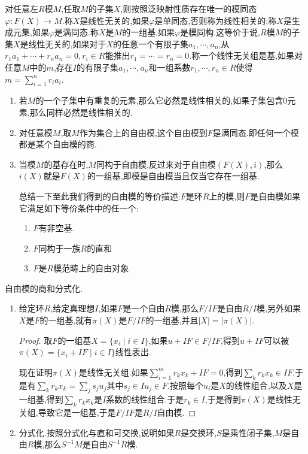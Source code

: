 对任意左$R$模$M$,任取$M$的子集$X$,则按照泛映射性质存在唯一的模同态$\varphi:F(X)\to M$.称$X$是线性无关的,如果$\varphi$是单同态,否则称为线性相关的;称$X$是生成元集,如果$\varphi$是满同态.称$X$是$M$的一组基,如果$\varphi$是模同构.这等价于说,$R$模$M$的子集$X$是线性无关的,如果对于$X$的任意一个有限子集$a_1,\cdots,a_n$,从
$r_1a_1+\cdots+r_na_n=0,r_i\in R$能推出$r_1=\cdots=r_n=0$.称一个线性无关组是基,如果对任意$M$中的$m$,存在$I$的有限子集$a_1,\cdots,a_n$和一组系数$r_1,\cdots,r_n\in R$使得$m=\sum_{i=1}^nr_ia_i$.
\begin{enumerate}
	\item 若$M$的一个子集中有重复的元素,那么它必然是线性相关的,如果子集包含0元素,那么同样必然是线性相关的.
	\item 对任意模$M$,取$M$作为集合上的自由模,这个自由模到$F$是满同态.即任何一个模都是某个自由模的商.
	\item 当模$M$的基存在时,$M$同构于自由模,反过来对于自由模$(F(X),i)$,那么$i(X)$就是$F(X)$的一组基,即模是自由模当且仅当它存在一组基.
	
	总结一下至此我们得到的自由模的等价描述:$F$是环$R$上的模,则$F$是自由模如果它满足如下等价条件中的任一个:
	\begin{enumerate}
		\item $F$有非空基.
		\item $F$同构于一族$R$的直和
		\item $F$是$R$模范畴上的自由对象
	\end{enumerate}
\end{enumerate}

自由模的商和分式化.
\begin{enumerate}
	\item 给定环$R$,给定真理想$I$,如果$F$是一个自由$R$模,那么$F/IF$是自由$R/I$模,另外如果$X$是$F$的一组基,就有$\pi(X)$是$F/IF$的一组基,并且$|X|=|\pi(X)|$.
	\begin{proof}
		
		取$F$的一组基$X=\{x_i\mid i\in I\}$,如果$u+IF\in F/IF$,得到$u+IF$可以被$\pi(X)=\{x_i+IF\mid i\in I\}$线性表出.
		
		现在证明$\pi(X)$是线性无关组.如果$\sum_{i=1}^{m}r_kx_k+IF=0$,得到$\sum_k r_kx_k\in IF$,于是有$\sum_kr_kx_k=\sum_j s_ju_j$其中$s_j\in I u_j\in F$.按照每个$u_i$是$X$的线性组合,以及$X$是一组基,得到$\sum_kr_kx_k$是$I$系数的线性组合.于是$r_k\in I$,于是得到$\pi(X)$是线性无关组,导致它是一组基,于是$F/IF$是$R/I$自由模.
	\end{proof}
    \item 分式化.按照分式化与直和可交换,说明如果$R$是交换环,$S$是乘性闭子集,$M$是自由$R$模,那么$S^{-1}M$是自由$S^{-1}R$模.
\end{enumerate}

